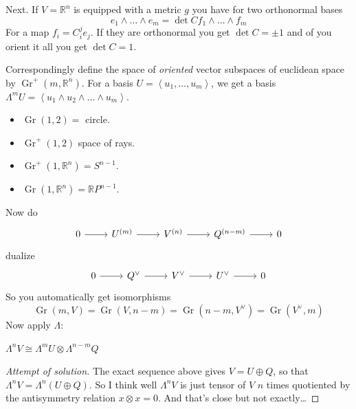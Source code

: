 Next. If \(V=\mathbb{R}^n\) is equipped with a metric \(g\) you have for two orthonormal bases
\[e_1 \wedge \ldots \wedge e_m=\det C f_1\wedge \ldots \wedge f_m\]
For a map \(f_i=C_i^j e_j\). If they are orthonormal you get \(\det C=\pm 1\) and of you orient it all you get \(\det C=1\).

Correspondingly define the space of \textit{oriented} vector subspaces of euclidean space by \(\operatorname{Gr}^+(m,\mathbb{R}^n)\).
For a basis \(U=\left<u_1,\ldots,u_m\right>\), we get a basis \(\Lambda^{m}U=\left<u_1\wedge u_2\wedge\ldots \wedge u_m\right>\).

\begin{example}\leavevmode
\begin{itemize}
\item \(\operatorname{Gr}(1,2)=\) circle.
\item \(\operatorname{Gr}^+(1,2)\) space of rays.
\item \(\operatorname{Gr}^+(1,\mathbb{R}^n)=S^{n-1}\).
\item \(\operatorname{Gr}(1,\mathbb{R}^n)=\mathbb{R}P^{n-1}\).
\end{itemize}
\end{example}

Now do
\[\begin{tikzcd}0\arrow[r]&U^{(m)}\arrow[r]&V^{(n)}\arrow[r]&Q^{(n-m)}\arrow[r]&0\end{tikzcd}\]
dualize
\[\begin{tikzcd}0\arrow[r]&Q^\vee\arrow[r]&V^\vee\arrow[r]&U^\vee\arrow[r]&0\end{tikzcd}\]
So you automatically get isomorphisms
\[\operatorname{Gr}(m,V)=\operatorname{Gr}(V,n-m)=\operatorname{Gr}(n-m,V^\vee)=\operatorname{Gr}(V^\vee,m)\]
Now apply \(\Lambda\):
\begin{exercise}\leavevmode
\(\Lambda^{n}V \cong \Lambda^{m}U \otimes \Lambda^{n-m}Q\)
\end{exercise}

\begin{proof}[Attempt of solution]\leavevmode
The exact sequence above gives \(V=U \oplus  Q\), so that \(\Lambda^{n}V=\Lambda^{n}(U \oplus  Q)\).  So I think well \(\Lambda^{n}V\) is just tensor of \(V\) \(n\) times quotiented by the antisymmetry relation \(x \otimes x=0\). And that's close but not exactly…

\end{proof}

